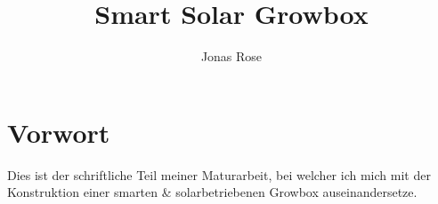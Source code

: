 \documentclass[12pt,a4paper]{report}
\title{Smart Solar Growbox}
\author{Jonas Rose}
\begin{document}
\maketitle
\tableofcontents
\chapter{Vorwort}
Dies ist der schriftliche Teil meiner Maturarbeit, bei welcher ich mich  mit der Konstruktion einer smarten \& solarbetriebenen Growbox auseinandersetze.
\end{document}
